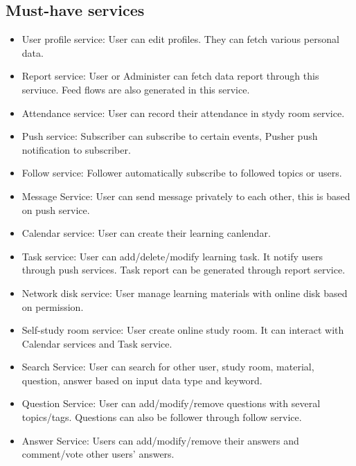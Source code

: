 \documentclass[runningheads]{llncs}
\begin{document}
\subsection*{Must-have services}
\begin{itemize}
    \item User profile service: User can edit profiles. They can fetch various personal data.
    \item Report service: User or Administer can fetch data report through this serviuce. Feed flows are also generated in this service.
    \item Attendance service: User can record their attendance in stydy room service. 
    \item Push service: Subscriber can subscribe to certain events, Pusher push notification to subscriber.
    \item Follow service: Follower automatically subscribe to followed topics or users.
    \item Message Service: User can send message privately to each other, this is based on push service.
    \item Calendar service: User can create their learning canlendar. 
    \item Task service: User can add/delete/modify learning task. It notify users through push services. Task report can be generated through report service.
    \item Network disk service: User manage learning materials with online disk based on permission.
    \item Self-study room service: User create online study room. It can interact with Calendar services and Task service.
    \item Search Service: User can search for other user, study room, material, question, answer based on input data type and keyword.
    \item Question Service: User can add/modify/remove questions with several topics/tags. Questions can also be follower through follow service.
    \item Answer Service: Users can add/modify/remove their answers and comment/vote other users' answers.
    
\end{itemize}
\end{document}
